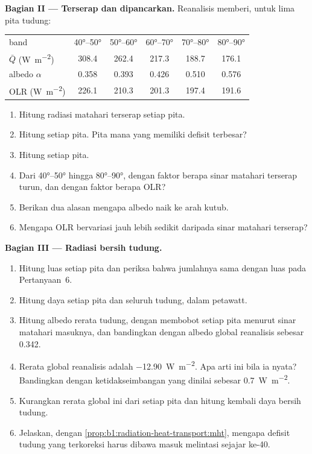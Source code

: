 \begin{problem}
\medskip
\noindent\textbf{Bagian II --- Terserap dan dipancarkan.} Reanalisis memberi, untuk lima
pita tudung:
\begin{center}
\small
\begin{tabular}{|l|ccccc|}
\hline
band & \ang{40}--\ang{50} & \ang{50}--\ang{60} & \ang{60}--\ang{70} & \ang{70}--\ang{80} & \ang{80}--\ang{90} \\
$\bar Q$ (\unit{W.m^{-2}}) & 308.4 & 262.4 & 217.3 & 188.7 & 176.1 \\
albedo $\alpha$ & 0.358 & 0.393 & 0.426 & 0.510 & 0.576 \\
OLR (\unit{W.m^{-2}}) & 226.1 & 210.3 & 201.3 & 197.4 & 191.6 \\
\hline
\end{tabular}
\end{center}
\begin{enumerate}[resume]
  \item Hitung radiasi matahari terserap setiap pita.
  \item Hitung  setiap pita. Pita mana yang memiliki defisit
        terbesar?
  \item Hitung  setiap pita.
  \item Dari \ang{40}--\ang{50} hingga \ang{80}--\ang{90}, dengan faktor berapa
        sinar matahari terserap turun, dan dengan faktor berapa OLR?
  \item Berikan dua alasan mengapa albedo naik ke arah kutub.
  \item Mengapa OLR bervariasi jauh lebih sedikit daripada sinar matahari terserap?
\end{enumerate}

\medskip
\noindent\textbf{Bagian III --- Radiasi bersih tudung.}
\begin{enumerate}[resume]
  \item Hitung luas setiap pita dan periksa bahwa jumlahnya sama dengan luas
        pada Pertanyaan~6.
  \item Hitung daya  setiap pita dan seluruh tudung, dalam
        petawatt.
  \item Hitung albedo rerata tudung, dengan membobot setiap pita menurut sinar
        matahari masuknya, dan bandingkan dengan albedo global reanalisis sebesar \num{0.342}.
  \item Rerata  global reanalisis adalah \qty{-12.90}{W.m^{-2}}. Apa
        arti ini bila ia nyata? Bandingkan dengan ketidakseimbangan yang dinilai sebesar
        \qty{+0.7}{W.m^{-2}}.
  \item Kurangkan rerata global ini dari  setiap pita dan hitung
        kembali daya bersih tudung.
  \item Jelaskan, dengan \cref{prop:b1:radiation-heat-transport:mht}, mengapa defisit
        tudung yang terkoreksi harus dibawa masuk melintasi sejajar ke-40.
\end{enumerate}


\end{problem}
